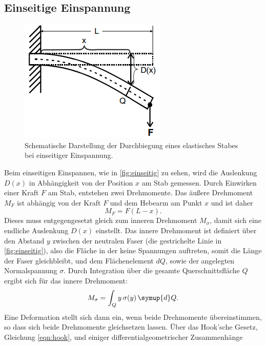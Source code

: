     \subsection{Einseitige Einspannung}
    \begin{figure}
        \centering
        \includegraphics{content/einseitig.png}
        \caption{Schematische Darstellung der Durchbiegung eines elastisches Stabes bei einseitiger Einspannung. \cite[107]{V103}}
        \label{fig:einseitig}
    \end{figure}
        Beim einseitigen Einspannen, wie in \autoref{fig:einseitig} zu sehen, wird die Auslenkung $D(x)$ in Abhängigkeit von der Position $x$ am Stab gemessen.
        Durch Einwirken einer Kraft $F$ am Stab, entstehen zwei Drehmomente. Das äußere Drehmoment $M_F$ ist abhängig von der Kraft $F$ und dem Hebearm am Punkt $x$ und 
        ist daher 
        \begin{equation}
        \label{eqn:drehmomentA}
            M_F = F (L-x).
        \end{equation}
        Dieses muss entgegengesetzt gleich zum inneren Drehmoment $M_\sigma$, damit sich eine endliche Auslenkung $D(x)$ einstellt.
        Das innere Drehmoment ist definiert über den Abstand $y$ zwischen der neutralen Faser (die gestrichelte Linie in \autoref{fig:einseitig}), also die Fläche in der keine Spannungen
        auftreten, somit die Länge der Faser gleichbleibt, und dem Flächenelement $dQ$, sowie der angelegten Normalspannung $\sigma$. Durch Integration über die gesamte
        Querschnittsfläche $Q$ ergibt sich für das innere Drehmoment:
        \begin{equation}
        \label{eqn:drehmomentI} 
            M_\sigma = \int_Q y \, \sigma (y) \, \symup{d}Q.
        \end{equation}
        Eine Deformation stellt sich dann ein, wenn beide Drehmomente übereinstimmen, so dass sich beide Drehmomente gleichsetzen lassen.
        Über das Hook'sche Gesetz, Gleichung \eqref{eqn:hook}, und einiger differentialgeometrischer Zusammenhänge
